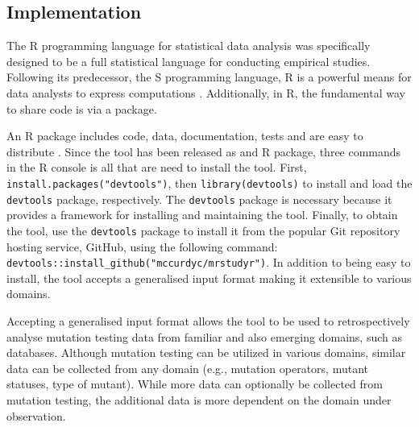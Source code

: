 \subsection{Implementation}

The R programming language for statistical data analysis was specifically designed to
be a full statistical language for conducting empirical studies. Following its predecessor, the S programming
language, R is a powerful means for data analysts to express computations \cite{ihaka1996r}.
Additionally, in R, the fundamental way to share code is via a package.

An R package includes code, data, documentation, tests and are easy to distribute \cite{wickham2015r}.
Since the \mr tool has been released as and R package, three commands in the R console
is all that are need to install the tool.
First, \texttt{install.packages("devtools")}, then \texttt{library(devtools)}
to install and load the \texttt{devtools}\cite{devtools} package, respectively.
The \texttt{devtools} package is necessary because it provides a framework for installing
and maintaining the tool. Finally, to obtain the
\mr\hspace*{-1em}\cite{mrstudyr} tool, use the \texttt{devtools} package to install it
from the popular Git repository hosting service, GitHub\cite{github},
using the following command: {\small\texttt{devtools::install\_github("mccurdyc/mrstudyr")}}.
In addition to being easy to install, the \mr tool accepts a generalised input format making
it extensible to various domains.

Accepting a generalised input format allows the \mr tool to be used to retrospectively analyse mutation testing
data from familiar and also emerging domains, such as databases. Although mutation
testing can be utilized in various domains, similar data can be collected from any
domain (e.g., mutation operators, mutant statuses, type of mutant). While more data
can optionally be collected from mutation testing, the additional data is more
dependent on the domain under observation.
